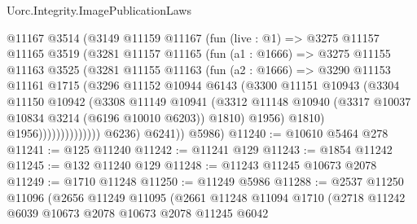 \begin{lexlean}{Uorc.Integrity.ImagePublicationLaws}
\begin{coremodule}
                        @11167
                        @3514
                        (@3149
                          @11159
                          @11167
                          (fun (live : @1) =>
                          @3275
                            @11157
                            @11165
                            @3519
                            (@3281
                              @11157
                              @11165
                              (fun (a1 : @1666) =>
                              @3275
                                @11155
                                @11163
                                @3525
                                (@3281
                                  @11155
                                  @11163
                                  (fun (a2 : @1666) =>
                                  @3290
                                    @11153
                                    @11161
                                    @1715
                                    (@3296
                                      @11152
                                      @10944
                                      @6143
                                      (@3300
                                        @11151
                                        @10943
                                        (@3304
                                          @11150
                                          @10942
                                          (@3308
                                            @11149
                                            @10941
                                            (@3312
                                              @11148
                                              @10940
                                              (@3317 @10037 @10834 @3214 (@6196 @10010 @6203))
                                              @1810)
                                            @1956)
                                          @1810)
                                        @1956))))))))))))))
            @6236)
          @6241))
      @5986)
@11240 := @10610 @5464 @278
@11241 := @125 @11240
@11242 := @11241 @129
@11243 := @1854 @11242
@11245 := @132 @11240 @129
@11248 := @11243 @11245 @10673 @2078
@11249 := @1710 @11248
@11250 := @11249 @5986
@11288 := @2537
    @11250
    @11096
    (@2656
      @11249
      @11095
      (@2661
        @11248
        @11094
        @1710
        (@2718
          @11242
          @6039
          @10673
          @2078
          @10673
          @2078
          @11245
          @6042

\end{coremodule}
\end{lexlean}
